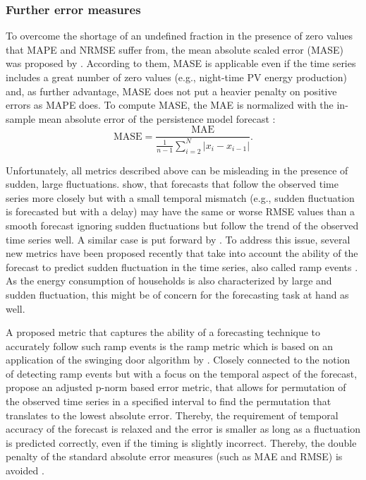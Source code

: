 \subsubsection{Further error measures}

To overcome the shortage of an undefined fraction in the presence of zero values that MAPE and NRMSE suffer from, the mean absolute scaled error (MASE) was proposed by \citet{Hyndman:2006}. According to them, MASE is applicable even if the time series includes a great number of zero values (e.g., night-time PV energy production) and, as further advantage, MASE does not put a heavier penalty on positive errors as MAPE does. To compute MASE, the MAE is normalized with the in-sample mean absolute error of the persistence model forecast \citet{Hyndman:2006}:
%
\begin{equation} \label{Eq:MASE}
\text{MASE}=\frac{\text{MAE}}{\frac{1}{n-1}\sum_{i=2}^N\left|x_i-x_{i-1}\right|}.
\end{equation}

Unfortunately, all metrics described above can be misleading in the presence of sudden, large fluctuations. \citet{Vallance:2017} show, that forecasts that follow the observed time series more closely but with a small temporal mismatch (e.g., sudden fluctuation is forecasted but with a delay) may have the same or worse RMSE values than a smooth forecast ignoring sudden fluctuations but follow the trend of the observed time series well. A similar case is put forward by \citet{Haben:2014}. To address this issue, several new metrics have been proposed recently that take into account the ability of the forecast to predict sudden fluctuation in the time series, also called ramp events \citep{Zhang:2015}. As the energy consumption of households is also characterized by large and sudden fluctuation, this might be of concern for the forecasting task at hand as well.

A proposed metric that captures the ability of a forecasting technique to accurately follow such ramp events is the ramp metric \citep{Vallance:2017} which is based on an application of the swinging door algorithm by \citet{Florita:2013}. Closely connected to the notion of detecting ramp events but with a focus on the temporal aspect of the forecast, \citet{Haben:2014} propose an adjusted p-norm based error metric, that allows for permutation of the observed time series in a specified interval to find the permutation that translates to the lowest absolute error. Thereby, the requirement of temporal accuracy of the forecast is relaxed and the error is smaller as long as a fluctuation is predicted correctly, even if the timing is slightly incorrect. Thereby, the double penalty of the standard absolute error measures (such as MAE and RMSE) is avoided \citep{Haben:2014}.

